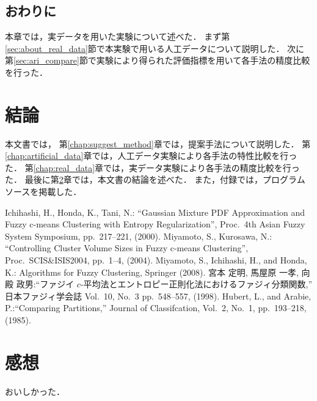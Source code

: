 \documentclass[a4j,12pt,dvipdfmx,oneside]{jsbook}
\theoremstyle{definition}
\begin{document}
\section{おわりに}\label{sec:real_data_summary}
本章では，実データを用いた実験について述べた．
まず第\ref{sec:about_real_data}節で本実験で用いる人工データについて説明した．
次に第\ref{sec:ari_compare}節で実験により得られた評価指標を用いて各手法の精度比較を行った．
%
%
%
%
\chapter{結論}\label{chap:conclusion}
本文書では，
第\ref{chap:suggest_method}章では，提案手法について説明した．
第\ref{chap:artificial_data}章では，人工データ実験により各手法の特性比較を行った．
第\ref{chap:real_data}章では，実データ実験により各手法の精度比較を行った．
最後に第\ref{chap:conclusion}章では，本文書の結論を述べた．
また，付録では，プログラムソースを掲載した．
%
%
%
%
%
%
\begin{thebibliography}{5}
Ichihashi, H., Honda, K., Tani, N.: ``Gaussian Mixture PDF Approximation and Fuzzy c-means Clustering with Entropy Regularization'', Proc.~4th Asian Fuzzy System Symposium, pp.~217--221, (2000).
Miyamoto, S., Kurosawa, N.: ``Controlling Cluster Volume Sizes in Fuzzy c-means Clustering'', Proc.~SCIS\&ISIS2004, pp.~1--4, (2004).
Miyamoto, S., Ichihashi, H., and Honda, K.: Algorithms for Fuzzy Clustering, Springer (2008).
宮本 定明, 馬屋原 一孝, 向殿 政男:``ファジイ $c$-平均法とエントロピー正則化法におけるファジィ分類関数,''  日本ファジィ学会誌 Vol.~10, No.~3  pp.~548--557, (1998).
 Hubert, L., and Arabie, P.:``Comparing Partitions,'' Journal of Classifcation, Vol.~2, No.~1,
pp.~193--218, (1985).
\end{thebibliography}
%
\chapter*{感想}
\label{chap:feel}
おいしかった．
\end{document}
